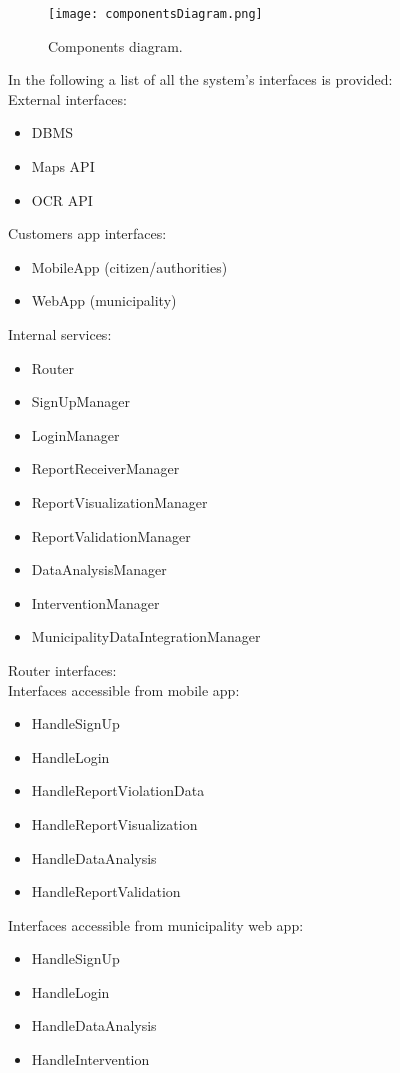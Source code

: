 \begin{figure}[H]
	\centering
	\texttt{[image: componentsDiagram.png]}
	\caption{Components diagram.}
\end{figure}
In the following a list of all the system's interfaces is provided:\\
External interfaces:
\begin{itemize}
	\item DBMS
	\item Maps API
	\item OCR API
\end{itemize}

Customers app interfaces:
\begin{itemize}
	\item MobileApp (citizen/authorities)
	\item WebApp (municipality)
\end{itemize}

Internal services:
\begin{itemize}
	\item Router
	\item SignUpManager
	\item LoginManager
	\item ReportReceiverManager
	\item ReportVisualizationManager
	\item ReportValidationManager
	\item DataAnalysisManager
	\item InterventionManager
	\item MunicipalityDataIntegrationManager
\end{itemize}

\bigskip
Router interfaces:\\
Interfaces accessible from mobile app:
\begin{itemize}
	\item HandleSignUp
	\item HandleLogin
	\item HandleReportViolationData
	\item HandleReportVisualization
	\item HandleDataAnalysis
	\item HandleReportValidation
\end{itemize}
Interfaces accessible from municipality web app:
\begin{itemize}
	\item HandleSignUp
	\item HandleLogin
	\item HandleDataAnalysis
	\item HandleIntervention
\end{itemize}

